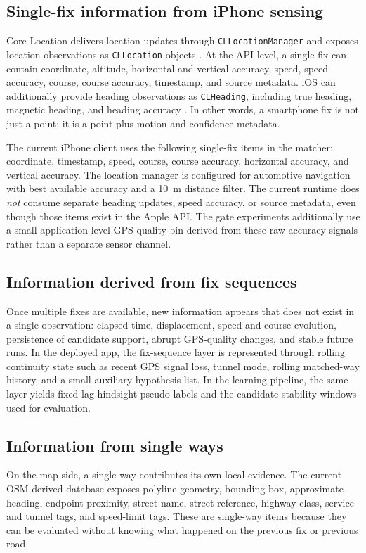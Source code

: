 \documentclass{article}
\begin{document}
\subsection{Single-fix information from iPhone sensing}
Core Location delivers location updates through \texttt{CLLocationManager} and exposes location observations as \texttt{CLLocation} objects \cite{apple_cllocationmanager,apple_cllocation}. At the API level, a single fix can contain coordinate, altitude, horizontal and vertical accuracy, speed, speed accuracy, course, course accuracy, timestamp, and source metadata. iOS can additionally provide heading observations as \texttt{CLHeading}, including true heading, magnetic heading, and heading accuracy \cite{apple_clheading}. In other words, a smartphone fix is not just a point; it is a point plus motion and confidence metadata.

The current iPhone client uses the following single-fix items in the matcher: coordinate, timestamp, speed, course, course accuracy, horizontal accuracy, and vertical accuracy. The location manager is configured for automotive navigation with best available accuracy and a \SI{10}{m} distance filter. The current runtime does \emph{not} consume separate heading updates, speed accuracy, or source metadata, even though those items exist in the Apple API. The gate experiments additionally use a small application-level GPS quality bin derived from these raw accuracy signals rather than a separate sensor channel.

\subsection{Information derived from fix sequences}
Once multiple fixes are available, new information appears that does not exist in a single observation: elapsed time, displacement, speed and course evolution, persistence of candidate support, abrupt GPS-quality changes, and stable future runs. In the deployed app, the fix-sequence layer is represented through rolling continuity state such as recent GPS signal loss, tunnel mode, rolling matched-way history, and a small auxiliary hypothesis list. In the learning pipeline, the same layer yields fixed-lag hindsight pseudo-labels and the candidate-stability windows used for evaluation.

\subsection{Information from single ways}
On the map side, a single way contributes its own local evidence. The current OSM-derived database exposes polyline geometry, bounding box, approximate heading, endpoint proximity, street name, street reference, highway class, service and tunnel tags, and speed-limit tags. These are single-way items because they can be evaluated without knowing what happened on the previous fix or previous road.
\end{document}
